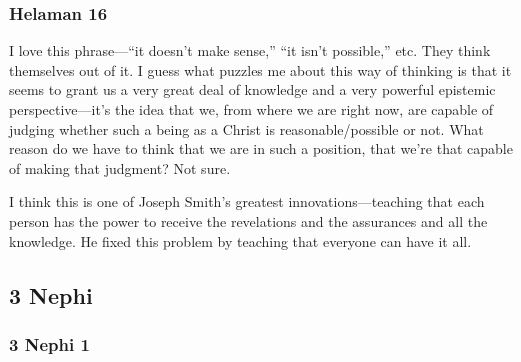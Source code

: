 	\subsubsection{Helaman 16} %
	
		\begin{compactdesc}
		
		\item[18$\vert$]
		\begin{compactdesc}
		\item[not reasonable] I love this phrase---``it doesn't make sense,'' ``it isn't possible,'' etc. They think themselves out of it. I guess what puzzles me about this way of thinking is that it seems to grant us a very great deal of knowledge and a very powerful epistemic perspective---it's the idea that we, from where we are right now, are capable of judging whether such a being as a Christ is reasonable/possible or not. What reason do we have to think that we are in such a position, that we're that capable of making that judgment? Not sure.
		\end{compactdesc}
		
		\item[21$\vert$]
		\begin{compactdesc}
		\item[we depend upon them to teach us the word] I think this is one of Joseph Smith's greatest innovations---teaching that each person has the power to receive the revelations and the assurances and all the knowledge. He fixed this problem by teaching that everyone can have it all.
		\end{compactdesc}
		
		\end{compactdesc}
		
\subsection{3 Nephi} %

	\subsubsection{3 Nephi 1} %
	
